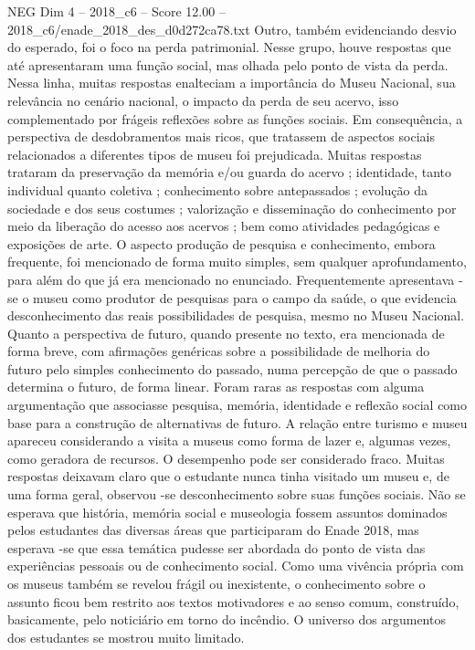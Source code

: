 \begin{textsample}{NEG Dim 4 – 2018\_c6 – Score 12.00 – 2018\_c6/enade\_2018\_des\_d0d272ca78.txt}
Outro, também evidenciando desvio do esperado, foi o foco na perda patrimonial.
Nesse grupo, houve respostas que até apresentaram uma função social, mas olhada pelo ponto de vista da perda.
Nessa linha, muitas respostas enalteciam a importância do Museu Nacional, sua relevância no cenário nacional, o impacto da perda de seu acervo, isso complementado por frágeis reflexões sobre as funções sociais.
Em consequência, a perspectiva de desdobramentos mais ricos, que tratassem de aspectos sociais relacionados a diferentes tipos de museu foi prejudicada.
Muitas respostas trataram da preservação da memória e/ou guarda do acervo ; identidade, tanto individual quanto coletiva ; conhecimento sobre antepassados ; evolução da sociedade e dos seus costumes ; valorização e disseminação do conhecimento por meio da liberação do acesso aos acervos ; bem como atividades pedagógicas e exposições de arte.
O aspecto produção de pesquisa e conhecimento, embora frequente, foi mencionado de forma muito simples, sem qualquer aprofundamento, para além do que já era mencionado no enunciado.
Frequentemente apresentava -se o museu como produtor de pesquisas para o campo da saúde, o que evidencia desconhecimento das reais possibilidades de pesquisa, mesmo no Museu Nacional.
Quanto a perspectiva de futuro, quando presente no texto, era mencionada de forma breve, com afirmações genéricas sobre a possibilidade de melhoria do futuro pelo simples conhecimento do passado, numa percepção de que o passado determina o futuro, de forma linear.
Foram raras as respostas com alguma argumentação que associasse pesquisa, memória, identidade e reflexão social como base para a construção de alternativas de futuro.
A relação entre turismo e museu apareceu considerando a visita a museus como forma de lazer e, algumas vezes, como geradora de recursos.
O desempenho pode ser considerado fraco.
Muitas respostas deixavam claro que o estudante nunca tinha visitado um museu e, de uma forma geral, observou -se desconhecimento sobre suas funções sociais.
Não se esperava que história, memória social e museologia fossem assuntos dominados pelos estudantes das diversas áreas que participaram do Enade 2018, mas esperava -se que essa temática pudesse ser abordada do ponto de vista das experiências pessoais ou de conhecimento social.
Como uma vivência própria com os museus também se revelou frágil ou inexistente, o conhecimento sobre o assunto ficou bem restrito aos textos motivadores e ao senso comum, construído, basicamente, pelo noticiário em torno do incêndio.
O universo dos argumentos dos estudantes se mostrou muito limitado.

\end{textsample}
